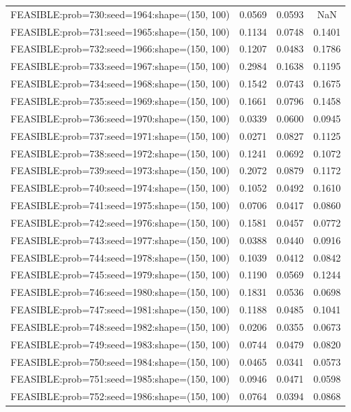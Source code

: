 \begin{longtable}{lccc}
FEASIBLE:prob=730:seed=1964:shape=(150, 100) & 0.0569 & 0.0593 &    NaN \\
FEASIBLE:prob=731:seed=1965:shape=(150, 100) & 0.1134 & 0.0748 & 0.1401 \\
FEASIBLE:prob=732:seed=1966:shape=(150, 100) & 0.1207 & 0.0483 & 0.1786 \\
FEASIBLE:prob=733:seed=1967:shape=(150, 100) & 0.2984 & 0.1638 & 0.1195 \\
FEASIBLE:prob=734:seed=1968:shape=(150, 100) & 0.1542 & 0.0743 & 0.1675 \\
FEASIBLE:prob=735:seed=1969:shape=(150, 100) & 0.1661 & 0.0796 & 0.1458 \\
FEASIBLE:prob=736:seed=1970:shape=(150, 100) & 0.0339 & 0.0600 & 0.0945 \\
FEASIBLE:prob=737:seed=1971:shape=(150, 100) & 0.0271 & 0.0827 & 0.1125 \\
FEASIBLE:prob=738:seed=1972:shape=(150, 100) & 0.1241 & 0.0692 & 0.1072 \\
FEASIBLE:prob=739:seed=1973:shape=(150, 100) & 0.2072 & 0.0879 & 0.1172 \\
FEASIBLE:prob=740:seed=1974:shape=(150, 100) & 0.1052 & 0.0492 & 0.1610 \\
FEASIBLE:prob=741:seed=1975:shape=(150, 100) & 0.0706 & 0.0417 & 0.0860 \\
FEASIBLE:prob=742:seed=1976:shape=(150, 100) & 0.1581 & 0.0457 & 0.0772 \\
FEASIBLE:prob=743:seed=1977:shape=(150, 100) & 0.0388 & 0.0440 & 0.0916 \\
FEASIBLE:prob=744:seed=1978:shape=(150, 100) & 0.1039 & 0.0412 & 0.0842 \\
FEASIBLE:prob=745:seed=1979:shape=(150, 100) & 0.1190 & 0.0569 & 0.1244 \\
FEASIBLE:prob=746:seed=1980:shape=(150, 100) & 0.1831 & 0.0536 & 0.0698 \\
FEASIBLE:prob=747:seed=1981:shape=(150, 100) & 0.1188 & 0.0485 & 0.1041 \\
FEASIBLE:prob=748:seed=1982:shape=(150, 100) & 0.0206 & 0.0355 & 0.0673 \\
FEASIBLE:prob=749:seed=1983:shape=(150, 100) & 0.0744 & 0.0479 & 0.0820 \\
FEASIBLE:prob=750:seed=1984:shape=(150, 100) & 0.0465 & 0.0341 & 0.0573 \\
FEASIBLE:prob=751:seed=1985:shape=(150, 100) & 0.0946 & 0.0471 & 0.0598 \\
FEASIBLE:prob=752:seed=1986:shape=(150, 100) & 0.0764 & 0.0394 & 0.0868 \\

\end{longtable}
